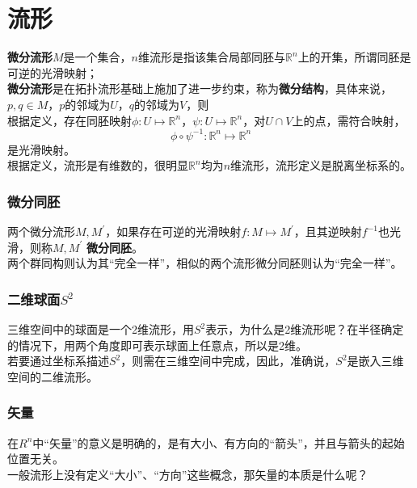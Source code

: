 \section{流形}
	\textbf{微分流形}$M$是一个集合，$n$维流形是指该集合局部同胚与$\mathbb{R}^n$上的开集，所谓同胚是可逆的光滑映射；\\

	\textbf{微分流形}是在拓扑流形基础上施加了进一步约束，称为\textbf{微分结构}，具体来说，\\

	$p,q \in M$，$p$的邻域为$U$，$q$的邻域为$V$，则\\

	根据定义，存在同胚映射$\phi: U\mapsto \mathbb{R}^n$，$\psi: U\mapsto \mathbb{R}^n$，对$U\cap V$上的点，需符合映射，
	$$
		\phi\circ\psi^{-1}: \mathbb{R}^n \mapsto \mathbb{R}^n
	$$
	是光滑映射。\\

	根据定义，流形是有维数的，很明显$\mathbb{R}^n$均为$n$维流形，流形定义是脱离坐标系的。

\subsubsection*{微分同胚}

两个微分流形$M,M^\prime$，如果存在可逆的光滑映射$f: M\mapsto M^\prime$，且其逆映射$f^{-1}$也光滑，则称$M,M^\prime$ \textbf{微分同胚}。\\

两个群同构则认为其“完全一样”，相似的两个流形微分同胚则认为“完全一样”。

\subsubsection*{二维球面$S^2$}
三维空间中的球面是一个2维流形，用$S^2$表示，为什么是2维流形呢？在半径确定的情况下，用两个角度即可表示球面上任意点，所以是2维。\\

若要通过坐标系描述$S^2$，则需在三维空间中完成，因此，准确说，$S^2$是嵌入三维空间的二维流形。

\subsubsection*{矢量}
	在$R^n$中“矢量”的意义是明确的，是有大小、有方向的“箭头”，并且与箭头的起始位置无关。\\

	一般流形上没有定义“大小”、“方向”这些概念，那矢量的本质是什么呢？\\

